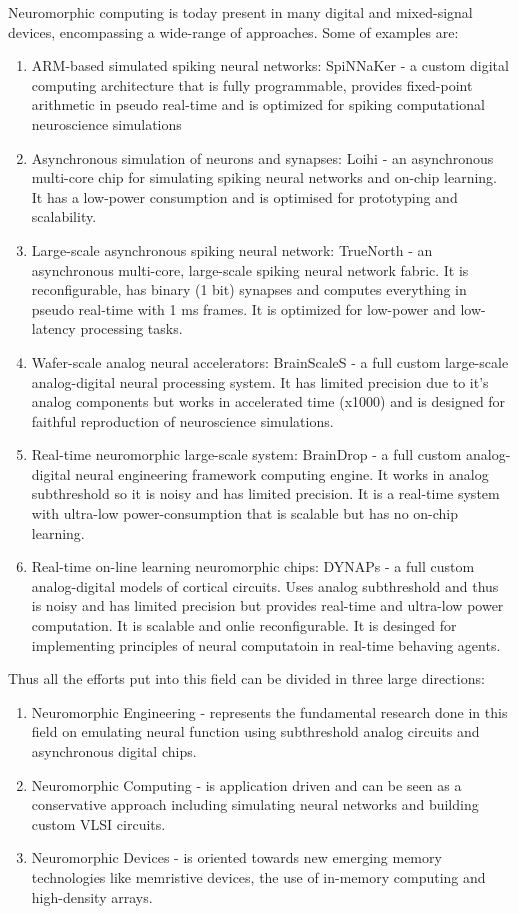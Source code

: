 \documentclass[main]{subfiles}
\begin{document}
Neuromorphic computing is today present in many digital and mixed-signal devices, encompassing a wide-range of approaches. Some of examples are:
\begin{enumerate}
    \item ARM-based simulated spiking neural networks: SpiNNaKer - a custom digital computing architecture that is fully programmable, provides fixed-point arithmetic in pseudo real-time and is optimized for spiking computational neuroscience simulations
    \item Asynchronous simulation of neurons and synapses: Loihi - an asynchronous multi-core chip for simulating spiking neural networks and on-chip learning. It has a low-power consumption and is optimised for prototyping and scalability.
    \item Large-scale asynchronous spiking neural network: TrueNorth - an asynchronous multi-core, large-scale spiking neural network fabric. It is reconfigurable, has binary (1 bit) synapses and computes everything in pseudo real-time with 1 ms frames. It is optimized for low-power and low-latency processing tasks.
    \item Wafer-scale analog neural accelerators: BrainScaleS - a full custom large-scale analog-digital neural processing system. It has limited precision due to it's analog components but works in accelerated time (x1000) and is designed for faithful reproduction of neuroscience simulations.
    \item Real-time neuromorphic large-scale system: BrainDrop - a full custom analog-digital neural engineering framework computing engine. It works in analog subthreshold so it is noisy and has limited precision. It is a real-time system with ultra-low power-consumption that is scalable but has no on-chip learning.
    \item Real-time on-line learning neuromorphic chips: DYNAPs - a full custom analog-digital models of cortical circuits. Uses analog subthreshold and thus is noisy and has limited precision but provides real-time and ultra-low power computation. It is scalable and onlie reconfigurable. It is desinged for implementing principles of neural computatoin in real-time behaving agents.
\end{enumerate}

Thus all the efforts put into this field can be divided in three large directions:

\begin{enumerate}
    \item Neuromorphic Engineering - represents the fundamental research done in this field on emulating neural function using subthreshold analog circuits and asynchronous digital chips.
    \item Neuromorphic Computing - is application driven and can be seen as a conservative approach including simulating neural networks and building custom VLSI circuits.
    \item Neuromorphic Devices - is oriented towards new emerging memory technologies like memristive devices, the use of in-memory computing and high-density arrays.
\end{enumerate}{}
\end{document}
